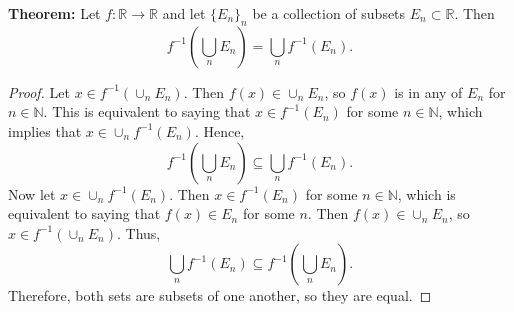 \documentclass{article}
\begin{document}
\begin{appendices}
\textbf{Theorem:} Let $f:\mathbb{R} \rightarrow \mathbb{R}$ and let $\{E_n\}_n$ be a collection of subsets $E_n \subset \mathbb{R}$. Then
\begin{equation}
	f^{-1}\left(\bigcup_n E_n\right) = \bigcup_n f^{-1}(E_n).
\end{equation}
\begin{proof}
	Let $x \in f^{-1}\left(\cup_n E_n\right)$. Then $f(x) \in \cup_n E_n$, so $f(x)$ is in any of $E_n$ for $n\in\mathbb{N}$. This is equivalent to saying that $x \in f^{-1}(E_n)$ for some $n \in \mathbb{N}$, which implies that $x \in \cup_n f^{-1}(E_n)$. Hence,
	\begin{equation}
		f^{-1}\left(\bigcup_n E_n\right) \subseteq \bigcup_n f^{-1}(E_n).
	\end{equation}
	Now let $x \in \cup_n f^{-1}(E_n)$. Then $x \in f^{-1}(E_n)$ for some $n \in \mathbb{N}$, which is equivalent to saying that $f(x) \in E_n$ for some $n$. Then $f(x) \in \cup_n E_n$, so $x \in f^{-1}\left(\cup_n E_n\right)$. Thus, 
	\begin{equation}
		\bigcup_n f^{-1}(E_n) \subseteq f^{-1}\left(\bigcup_n E_n\right).
	\end{equation}
	Therefore, both sets are subsets of one another, so they are equal.
\end{proof}

\end{appendices}
	
\end{document}
